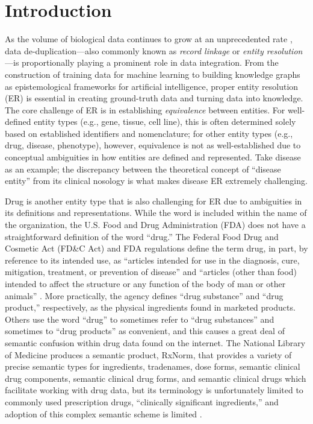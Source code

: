 \documentclass{bmcart}
\begin{document}
\section*{Introduction}
As the volume of biological data continues to grow at an unprecedented
rate \cite{Searls2005}, data de-duplication---also commonly known as
\emph{record linkage} \cite{Fellegi1969} or \emph{entity
  resolution}---is proportionally playing a prominent role in data
integration. From the construction of training data for machine
learning to building knowledge graphs as 
epistemological frameworks for artificial intelligence, proper entity
resolution (ER) is essential in creating ground-truth data and turning
data into knowledge. The core challenge of ER is in establishing
\emph{equivalence} between entities. For
well-defined entity types (e.g., gene, tissue, cell line), this
is often determined solely based on established identifiers and
nomenclature; for other entity types (e.g., drug, disease, phenotype),
however, equivalence is not as well-established due to conceptual
ambiguities in how entities are defined and represented. Take disease
as an example; the discrepancy between the 
theoretical concept of ``disease entity'' from its clinical
nosology \cite{Hucklenbroich2014} is what makes disease ER extremely
challenging.

Drug is another entity type that is also challenging for ER due to
ambiguities in its definitions and representations. While the word is
included within the name of the organization, the 
U.S. Food and Drug Administration (FDA) does not have a
straightforward definition of the word ``drug.'' The Federal Food Drug
and Cosmetic Act (FD\&C Act) and FDA regulations define the term drug,
in part, by reference to its intended use, as ``articles intended for
use in the diagnosis, cure, mitigation, treatment, or prevention of
disease” and “articles (other than food) intended to affect the
structure or any function of the body of man or other
animals'' \cite{FDADrug}. More practically, the agency defines ``drug
substance'' and ``drug product,'' respectively, as the physical
ingredients found in marketed products. Others use the word ``drug''
to sometimes refer to ``drug substances'' and sometimes to ``drug
products'' as convenient, and this causes a great deal of semantic
confusion within drug data found on the internet. The National Library of
Medicine produces a semantic product, RxNorm, that provides a variety
of precise semantic types for ingredients, tradenames, dose forms,
semantic clinical drug components, semantic clinical drug forms, and
semantic clinical drugs which facilitate working with drug data, but
its terminology is unfortunately limited to commonly used prescription
drugs, ``clinically significant ingredients,'' and adoption of this
complex semantic scheme is limited \cite{RxNorm}. 
\end{document}

